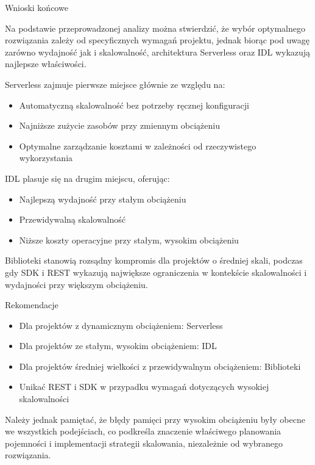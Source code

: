 \documentclass[runningheads,12pt]{llncs}
\begin{document}
Wnioski końcowe

Na podstawie przeprowadzonej analizy można stwierdzić, że wybór optymalnego rozwiązania zależy od specyficznych wymagań projektu, jednak biorąc pod uwagę zarówno wydajność jak i skalowalność, architektura Serverless oraz IDL wykazują najlepsze właściwości.

Serverless zajmuje pierwsze miejsce głównie ze względu na:
\begin{itemize}
    \item Automatyczną skalowalność bez potrzeby ręcznej konfiguracji
    \item Najniższe zużycie zasobów przy zmiennym obciążeniu
    \item Optymalne zarządzanie kosztami w zależności od rzeczywistego wykorzystania
\end{itemize}

IDL plasuje się na drugim miejscu, oferując:
\begin{itemize}
    \item Najlepszą wydajność przy stałym obciążeniu
    \item Przewidywalną skalowalność
    \item Niższe koszty operacyjne przy stałym, wysokim obciążeniu
\end{itemize}

Biblioteki stanowią rozsądny kompromis dla projektów o średniej skali, podczas gdy SDK i REST wykazują największe ograniczenia w kontekście skalowalności i wydajności przy większym obciążeniu.

Rekomendacje

\begin{itemize}
    \item Dla projektów z dynamicznym obciążeniem: Serverless
    \item Dla projektów ze stałym, wysokim obciążeniem: IDL
    \item Dla projektów średniej wielkości z przewidywalnym obciążeniem: Biblioteki
    \item Unikać REST i SDK w przypadku wymagań dotyczących wysokiej skalowalności
\end{itemize}

Należy jednak pamiętać, że błędy pamięci przy wysokim obciążeniu były obecne we wszystkich podejściach, co podkreśla znaczenie właściwego planowania pojemności i implementacji strategii skalowania, niezależnie od wybranego rozwiązania.

\end{document}

